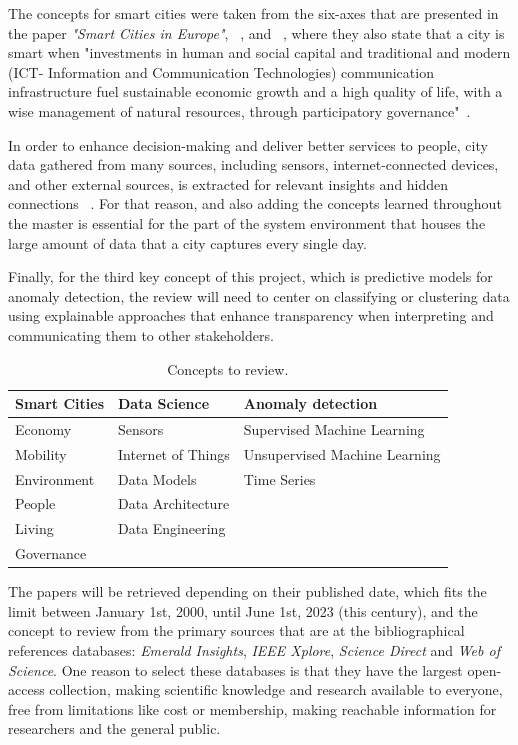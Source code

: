 \documentclass[a4paper,12pt,twoside]{ThesisStyle}
\begin{document}
The concepts for smart cities were taken from the six-axes that are presented in the paper \textit{"Smart Cities in Europe"}, ~\cite{allam2019big}, and ~\cite{singh2022decade},  where they also state that a city is smart when "investments in human and social capital and traditional and modern (ICT- Information and Communication Technologies) communication infrastructure fuel sustainable economic growth and a high quality of life, with a wise management of natural resources, through participatory governance"~\cite{SmartCitiesEurope2011}. 

In order to enhance decision-making and deliver better services to people, city data gathered from many sources, including sensors, internet-connected devices, and other external sources, is extracted for relevant insights and hidden connections ~\cite{SmartCitiesDataScience2022}. For that reason, and also adding the concepts learned throughout the master is essential for the part of the system environment that houses the large amount of data that a city captures every single day. 

Finally, for the third key concept of this project, which is predictive models for anomaly detection, the review will need to center on classifying or clustering data using explainable approaches that enhance transparency when interpreting and communicating them to other stakeholders. 

\renewcommand{\arraystretch}{1.5}
\begin{table}[htb]
\centering
\begin{tabular}{ | l | l | l | }
 \hline
  \textbf{Smart Cities} & \textbf{Data Science} & \textbf{Anomaly detection} \\
\hline
 Economy & Sensors & Supervised Machine Learning \\
 Mobility  &  Internet of Things & Unsupervised Machine Learning \\
 Environment  & Data Models & Time Series\\
 People & Data Architecture & \\
 Living & Data Engineering & \\
 Governance &  & \\
  \hline
  \end{tabular}
\caption{Concepts to review.}
\label{taula:SearchConcepts} 
\end{table}

The papers will be retrieved depending on their published date, which fits the limit between January 1st, 2000, until June 1st, 2023 (this century), and the concept to review from the primary sources that are at the bibliographical references databases: \textit{Emerald Insights}, \textit{IEEE Xplore}, \textit{Science Direct} and \textit{Web of Science}. One reason to select these databases is that they have the largest open-access collection, making scientific knowledge and research available to everyone, free from limitations like cost or membership, making reachable information for researchers and the general public.
\end{document}
